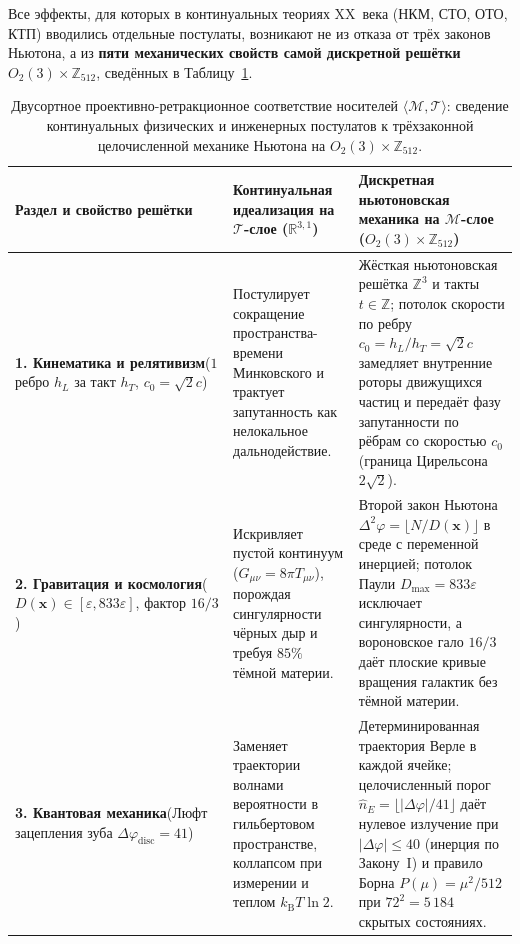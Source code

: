 \documentclass[11pt,a4paper]{article}
\theoremstyle{plain}
\theoremstyle{definition}
\begin{document}
Все эффекты, для которых в континуальных теориях XX~века (НКМ, СТО, ОТО, КТП) вводились отдельные постулаты, возникают не из отказа от трёх законов Ньютона, а из \textbf{пяти механических свойств самой дискретной решётки $O_2(3)\times\mathbb{Z}_{512}$}, сведённых в Таблицу~\ref{tab:newtonian-homeomorphism}.

\begin{table}[htbp]
\centering
\caption{Двусортное проективно-ретракционное соответствие носителей $\langle\mathcal{M},\mathcal{T}\rangle$: сведение континуальных физических и инженерных постулатов к трёхзаконной целочисленной механике Ньютона на $O_2(3)\times\mathbb{Z}_{512}$.}
\label{tab:newtonian-homeomorphism}
\footnotesize
\begin{tabular}{@{}p{}p{}p{}@{}}
\toprule
\textbf{Раздел и свойство решётки} & \textbf{Континуальная идеализация на $\mathcal{T}$-слое ($\mathbb{R}^{3,1}$)} & \textbf{Дискретная ньютоновская механика на $\mathcal{M}$-слое ($O_2(3)\times\mathbb{Z}_{512}$)} \\
\midrule
\textbf{1. Кинематика и релятивизм}\newline ($1$ ребро $h_L$ за такт $h_T$, $c_0=\sqrt{2}c$) &
Постулирует сокращение пространства-времени Минковского и трактует запутанность как нелокальное дальнодействие. &
Жёсткая ньютоновская решётка $\mathbb{Z}^3$ и такты $t\in\mathbb{Z}$; потолок скорости по ребру $c_0 = h_L/h_T = \sqrt{2}c$ замедляет внутренние роторы движущихся частиц и передаёт фазу запутанности по рёбрам со скоростью $c_0$ (граница Цирельсона $2\sqrt{2}$). \\
\addlinespace[3pt]
\textbf{2. Гравитация и космология}\newline ($D(\mathbf{x})\in[\varepsilon,833\varepsilon]$, фактор $16/3$) &
Искривляет пустой континуум ($G_{\mu\nu}=8\pi T_{\mu\nu}$), порождая сингулярности чёрных дыр и требуя $85\%$ тёмной материи. &
Второй закон Ньютона $\Delta^2\varphi = \lfloor N/D(\mathbf{x})\rfloor$ в среде с переменной инерцией; потолок Паули $D_{\max}=833\varepsilon$ исключает сингулярности, а вороновское гало $16/3$ даёт плоские кривые вращения галактик без тёмной материи. \\
\addlinespace[3pt]
\textbf{3. Квантовая механика}\newline (Люфт зацепления зуба $\Delta\varphi_{\mathrm{disc}}=41$) &
Заменяет траектории волнами вероятности в гильбертовом пространстве, коллапсом при измерении и теплом $k_{\mathrm{B}}T\ln 2$. &
Детерминированная траектория Верле в каждой ячейке; целочисленный порог $\hat{n}_E = \lfloor|\Delta\varphi|/41\rfloor$ даёт нулевое излучение при $|\Delta\varphi|\le 40$ (инерция по Закону~I) и правило Борна $P(\mu)=\mu^2/512$ при $72^2=5\,184$ скрытых состояниях. \\

\end{tabular}
\end{table}
\end{document}
